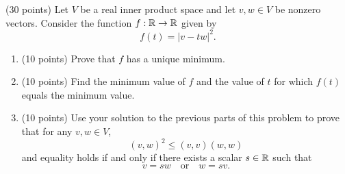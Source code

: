\begin{exercise}
  \label{ex:hw07:minimization-and-cauchy-schwarz}
  (30 points) Let \(V\) be a real inner product space and let
  \(v,w\in V\) be nonzero vectors. Consider the function
  \(f:\mathbb{R}\to\mathbb{R}\) given by
  \[
    f(t)=|v-tw|^2.
  \]
  \begin{enumerate}[{4}.1.][3]
    \item (10 points) Prove that \(f\) has a unique minimum.
    \item (10 points) Find the minimum value of \(f\) and the value of
      \(t\) for which \(f(t)\) equals the minimum value.
    \item (10 points) Use your solution to the previous parts of this
      problem to prove that for any \(v,w\in V\),
      \[
        (v,w)^2\le(v,v)(w,w)
      \]
      and equality holds if and only if there exists a scalar
      \(s\in\mathbb{R}\) such that
      \[
        v=sw\quad\text{or}\quad w=sv.
      \]
  \end{enumerate}
\end{exercise}

